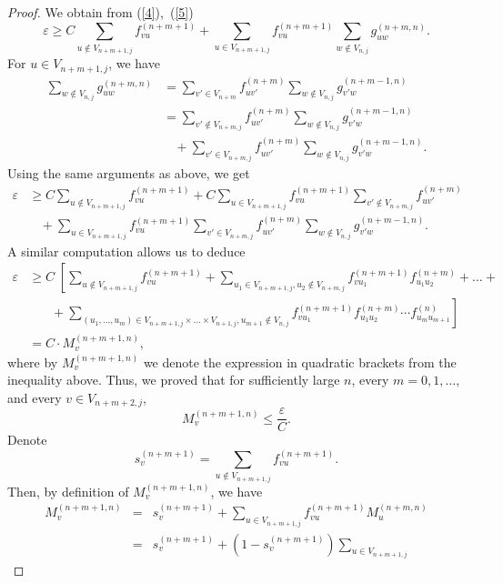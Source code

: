 \documentclass[11pt, english, reqno]{amsart}
\theoremstyle{definition}
\theoremstyle{remark}
\theoremstyle{plain}
\numberwithin{equation}{section}
\begin{document}
{\begin{proof}
We obtain from (\ref{4}),~(\ref{5})
$$
\varepsilon \geq C \sum_{u \notin V_{n+m+1,j}}f_{vu}^{(n+m+1)} +
\sum_{u \in V_{n+m+1,j}}f_{vu}^{(n+m+1)} \sum_{w \notin V_{n,j}}
g_{uw}^{(n+m,n)}.
$$
For $u \in V_{n+m+1,j}$, we have
$$
\begin{aligned}
\sum_{w \notin V_{n,j}} g_{uw}^{(n+m,n)} &= \sum_{v' \in V_{n+m}}
f_{uv'}^{(n+m)} \sum_{w \notin V_{n,j}}g_{v'w}^{(n+m-1,n)} \\
& =  \sum_{v' \notin V_{n+m,j}}f_{uv'}^{(n+m)} \sum_{w \notin V_{n,j}}
 g_{v'w}^{(n+m-1,n)}\\
 & \ \ \ \  + \sum_{v' \in V_{n+m,j}}f_{uv'}^{(n+m)} \sum_{w
 \notin V_{n,j}}g_{v'w}^{(n+m-1,n)}.
\end{aligned}
$$
Using the same arguments as above, we get
$$
\begin{aligned}
\varepsilon  & \geq C \sum_{u \notin V_{n+m+1,j}}f_{vu}^{(n+m+1)} + C
\sum_{u \in V_{n+m+1,j}}f_{vu}^{(n+m+1)} \sum_{v' \notin V_{n+m,j}}
f_{uv'}^{(n+m)} \\
& \ \ \ \ + \sum_{u \in V_{n+m+1,j}}f_{vu}^{(n+m+1)}\sum_{v' \in
V_{n+m,j}} f_{uv'}^{(n+m)} \sum_{w \notin V_{n,j}}g_{v'w}^{(n+m-1,n)}.
\end{aligned}
$$
A similar computation allows us to deduce
$$
\begin{aligned}
\varepsilon  & \geq C \; \left[\sum_{u \notin V_{n+m+1,j}} f_{vu}^{(n+m+1)} +
\sum_{u_1 \in V_{n+m+1,j}, u_2 \notin V_{n+m,j}} f^{(n+m+1)}_{vu_1}
f^{(n+m)}_{u_1 u_2} + \ldots +\right.\\
& \ \ \ \ \ \ \ \ + \left. \sum_{(u_1,\ldots, u_m) \in V_{n+m+1,j}\times \ldots \times V_{n
+1,j}, u_{m+1} \notin V_{n,j}}f^{(n+m+1)}_{vu_1} f^{(n+m)}_{u_1 u_2}
\cdots f^{(n)}_{u_m u_{m+1}}\right] \\
& = C \cdot M_v^{(n+m+1,n)},
\end{aligned}
$$
where by $M_v^{(n+m+1,n)}$ we denote the expression in quadratic
brackets from the inequality above.
Thus, we proved that for sufficiently large $n$, every $m = 0, 1, \ldots$,
and every $v \in V_{n+m+2,j}$,
\begin{equation}\label{M-estimate}
M_v^{(n+m+1, n)} \leq \frac{\varepsilon}{C}.
\end{equation}
Denote
$$
s_v^{(n+m+1)} = \sum_{u \notin V_{n+m+1,j}} f_{vu}^{(n+m+1)}.
$$
Then, by definition of $M_v^{(n+m+1, n)}$, we have
\begin{eqnarray*}
M_v^{(n+m+1, n)} &=& s_v^{(n+m+1)} + \sum_{u \in V_{n+m+1,j}}
f_{vu}^{(n+m+1)} M_u^{(n+m, n)}\\
&=& s_v^{(n+m+1)} + (1 - s_v^{(n+m+1)}) \sum_{u \in V_{n+m+1,j}}

\end{eqnarray*}
\end{proof}}
\end{document}
